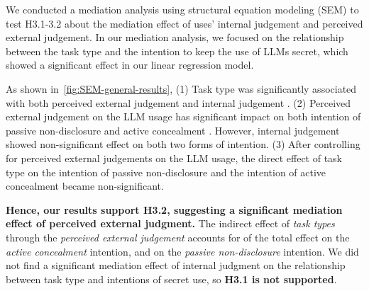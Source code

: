 We conducted a mediation analysis using structural equation modeling (SEM) to test H3.1-3.2 about the mediation effect of uses' internal judgement and perceived external judgement.
In our mediation analysis, we focused on the relationship between the task type and the intention to keep the use of LLMs secret, which showed a significant effect in our linear regression model. 


As shown in~\autoref{fig:SEM-general-results}, 
(1) Task type was significantly associated with both perceived external judgement  and internal judgement . 
(2) Perceived external judgement on the LLM usage has significant impact on both intention of passive non-disclosure  and active concealment . 
However, internal judgement showed non-significant effect on both two forms of intention.
(3) After controlling for perceived external judgements on the LLM usage, the direct effect of task type on the intention of passive non-disclosure  and the intention of active concealment  became non-significant.


\textbf{Hence, our results support H3.2, suggesting a significant mediation effect of perceived external judgment.}
The indirect effect of \textit{task types} through the \textit{perceived external judgement} accounts for  of the total effect on the \textit{active concealment} intention, and  on the \textit{passive non-disclosure} intention.
We did not find a significant mediation effect of internal judgment on the relationship between task type and intentions of secret use, so \textbf{H3.1 is not supported}.


